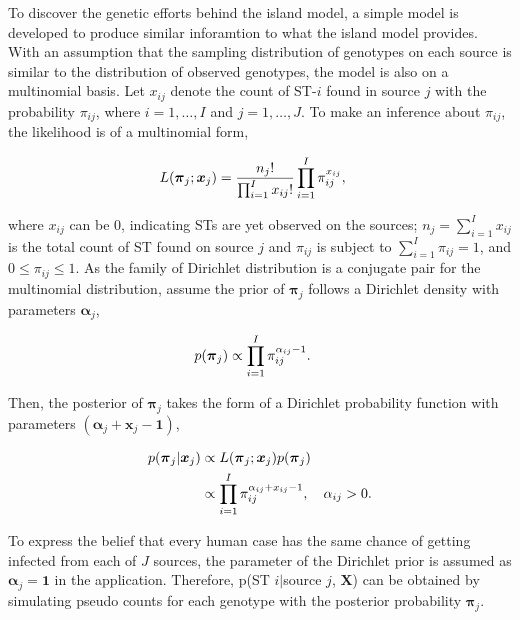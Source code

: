 \documentclass[times, doublespace]{WileyNJD-v2}%
\begin{document}
To discover the genetic efforts behind the island model, a simple model is developed to produce similar inforamtion to what the island model provides. With an assumption that the sampling distribution of genotypes on each source is similar to the distribution of observed genotypes, the model is also on a multinomial basis. Let $x_{ij}$ denote the count of ST-$i$ found in source $j$ with the probability $\pi_{ij}$, where $i=1, \ldots, I$ and $j=1, \ldots, J$. To make an inference about $\pi_{ij}$, the likelihood is of a multinomial form,

\begin{align}
        L(\boldsymbol{\pi}_{j} ; \boldsymbol{x}_{j}) & = \frac{n_j!}{\prod_{i=1}^{I} x_{ij}!} \prod_{i=1}^I \pi_{ij}^{x_{ij}}, \notag
\end{align}

where $x_{ij}$ can be $0$, indicating STs are yet observed on the sources; $n_j=\sum_{i=1}^I x_{ij}$ is the total count of ST found on source $j$ and $\pi_{ij}$ is subject to $\sum_{i=1}^I \pi_{ij} =1$, and $0 \leq \pi_{ij} \leq 1$. As the family of Dirichlet distribution is a conjugate pair for the multinomial distribution, assume the prior of $\boldsymbol{\pi}_{j}$ follows a Dirichlet density with parameters $\boldsymbol{\alpha}_{j}$, 

\begin{align}
  p(\boldsymbol{\pi}_{j}) & \propto \prod_{i=1}^{I}\pi_{ij}^{\alpha_{ij}-1}. \notag
\end{align}

Then, the posterior of $\boldsymbol{\pi}_{j}$ takes the form of a Dirichlet probability function with parameters $(\boldsymbol{\alpha}_{j}+\boldsymbol{x}_{j}-\boldsymbol{1})$,

\begin{align}
        p(\boldsymbol{\pi}_{j} \vert \boldsymbol{x}_{j} ) & \propto L(\boldsymbol{\pi}_{j} ; \boldsymbol{x}_{j}) p(\boldsymbol{\pi}_{j}) \notag \\ 
       & \propto \prod_{i=1}^{I}\pi_{ij}^{\alpha_{ij} + x_{ij}-1}, \quad \alpha_{ij} >0. \notag
 \end{align}

To express the belief that every human case has the same chance of getting infected from each of $J$ sources, the parameter of the Dirichlet prior is assumed as $\boldsymbol{\alpha}_{j}=\boldsymbol{1}$ in the application. Therefore, p(ST $i\vert$source $j$, $\boldsymbol{X}$) can be obtained by simulating pseudo counts for each genotype with the posterior probability $\boldsymbol{\pi}_{j}$.
\end{document}
